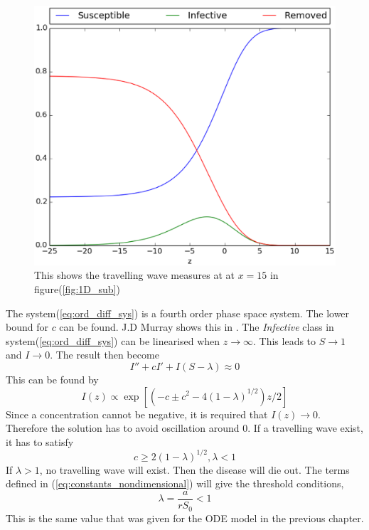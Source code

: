 \documentclass[%
twoside,                 %
final,                   %
10pt]{article}
\begin{document}
\begin{figure}[ht]
  \centerline{\includegraphics[width=0.9\linewidth]{plots/epidemic_wave_z_lambda_0_5.eps}}
  \caption{
  \label{fig:1D_tw} This shows the travelling wave measures at at $x=15$ in figure(\ref{fig:1D_sub})
  }
\end{figure}


The system(\ref{eq:ord_diff_sys}) is a fourth order phase space system. The lower bound for $c$ can be found. J.D Murray shows this in \cite{murray2003mathematical}. The \emph{Infective} class in system(\ref{eq:ord_diff_sys}) can be linearised when $z\rightarrow \infty$. This leads to $S\rightarrow 1$ and $I \rightarrow 0$. The result then become 
\begin{equation}
	I'' + cI' + I(S-\lambda) \approx 0 
\end{equation}
This can be found by
\begin{equation}
I(z) \varpropto \exp\left[(-c \pm {c^2 -4(1-\lambda)}^{1/2})z/2\right]
\end{equation}
Since a concentration cannot be negative, it is required that $I(z)\rightarrow 0$. Therefore the solution has to avoid oscillation around 0. If a travelling wave exist, it has to satisfy
\begin{equation}
	c \geq 2(1-\lambda)^{1/2}, \lambda < 1
\end{equation}
If $\lambda > 1$, no travelling wave will exist. Then the disease will die out. The terms defined in (\ref{eq:constants_nondimensional}) will give the threshold conditions,
\begin{equation}
	\lambda = \frac{a}{rS_0} < 1
\end{equation}
This is the same value that was given for the ODE model in the previous chapter.
\end{document}
